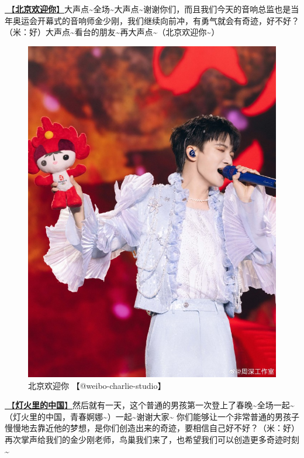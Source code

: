 \documentclass[]{ctexbook}
\begin{document}
\hyperref[welcome-to-beijing]{🎵【\textbf{北京欢迎你}】}大声点\textasciitilde 全场\textasciitilde 大声点\textasciitilde 谢谢你们，而且我们今天的音响总监也是当年奥运会开幕式的音响师金少刚，我们继续向前冲，有勇气就会有奇迹，好不好？（米：好）大声点\textasciitilde 看台的朋友\textasciitilde 再大声点\textasciitilde（北京欢迎你\textasciitilde）

\begin{figure}

{\centering \includegraphics[width=400pt]{img/beijing20240922/001} 

}

\caption{北京欢迎你 【@weibo-charlie-studio】}\label{fig:unnamed-chunk-108}
\end{figure}

\hyperref[China-in-the-lights]{🎵【\textbf{灯火里的中国}】}然后就有一天，这个普通的男孩第一次登上了春晚\textasciitilde 全场一起\textasciitilde（灯火里的中国，青春婀娜\textasciitilde）一起\textasciitilde 谢谢大家\textasciitilde{}
你们能够让一个非常普通的男孩子慢慢地去靠近他的梦想，是你们创造出来的奇迹，要相信自己好不好？（米：好）再次掌声给我们的金少刚老师，鸟巢我们来了，也希望我们可以创造更多奇迹时刻\textasciitilde{}
\end{document}

